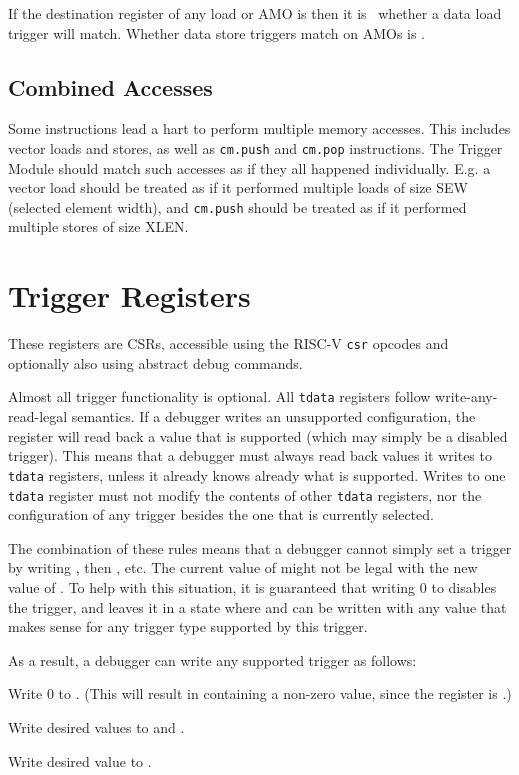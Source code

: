 If the destination register of any load or AMO is \Rzero then it is
\unspecified\ whether a data load trigger will match.  Whether data store
triggers match on AMOs is \unspecified.

\subsection{Combined Accesses}

Some instructions lead a hart to perform multiple memory accesses. This includes
vector loads and stores, as well as {\tt cm.push} and {\tt cm.pop} instructions.
The Trigger Module should match such accesses as if they all happened
individually. E.g. a vector load should be treated as if it performed multiple
loads of size SEW (selected element width), and {\tt cm.push} should be treated
as if it performed multiple stores of size XLEN.

\section{Trigger Registers}

These registers are CSRs, accessible using the RISC-V {\tt csr} opcodes and
optionally also using abstract debug commands.

Almost all trigger functionality is optional. All {\tt tdata} registers follow
write-any-read-legal semantics. If a debugger writes an unsupported
configuration, the register will read back a value that is supported (which may
simply be a disabled trigger).  This means that a debugger must always read
back values it writes to {\tt tdata} registers, unless it already knows already
what is
supported.  Writes to one {\tt tdata} register must not modify the contents of
other {\tt tdata} registers, nor the configuration of any trigger besides the
one that is currently selected.

The combination of these rules means that a debugger cannot simply set a
trigger by writing \RcsrTdataOne, then \RcsrTdataTwo, etc. The current value
of \RcsrTdataTwo might not be legal with the new value of \RcsrTdataOne. To
help with this situation, it is guaranteed that writing 0 to \RcsrTdataOne
disables the trigger, and leaves it in a state where \RcsrTdataTwo and
\RcsrTdataThree can be written with any value that makes sense for any
trigger type supported by this trigger.

\begin{steps}{As a result, a debugger can write any supported trigger as
follows:}
\item Write 0 to \RcsrTdataOne. (This will result in \RcsrTdataOne containing a
    non-zero value, since the register is \warl.)
\item Write desired values to \RcsrTdataTwo and \RcsrTdataThree.
\item Write desired value to \RcsrTdataOne.
\end{steps}

